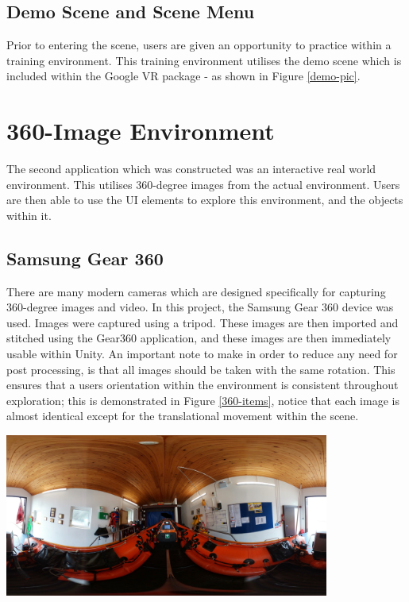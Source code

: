 \documentclass[ %
                    author={Elis Jones},
                supervisor={Dr. Kirsten Cater},
                    degree={BSc},
                     title={The Effect of Presentation Medium on Spatial Cognition},
                  subtitle={in the Virtual Environment},
                      year={2018} ]{dissertation}
\begin{document}
\subsection{Demo Scene and Scene Menu}\label{demo}
Prior to entering the scene, users are given an opportunity to practice within a training environment. This training environment utilises the demo scene which is included within the Google VR package - as shown in Figure \ref{demo-pic}.

\section{360-Image Environment}
The second application which was constructed was an interactive real world environment. This utilises 360-degree images from the actual environment. Users are then able to use the UI elements to explore this environment, and the objects within it. 

\subsection{Samsung Gear 360}
There are many modern cameras which are designed specifically for capturing 360-degree images and video. In this project, the Samsung Gear 360 device was used. Images were captured using a tripod. These images are then imported and stitched using the Gear360 application, and these images are then immediately usable within Unity. An important note to make in order to reduce any need for post processing, is that all images should be taken with the same rotation. This ensures that a users orientation within the environment is consistent throughout exploration; this is demonstrated in Figure \ref{360-items}, notice that each image is almost identical except for the translational movement within the scene. 

\begin{minipage}{\textwidth}
\hfill \break
\centering
\includegraphics[width=0.8\textwidth]{images/centre}
\label{360-central}
\hfill \break
\end{minipage}
\end{document}
